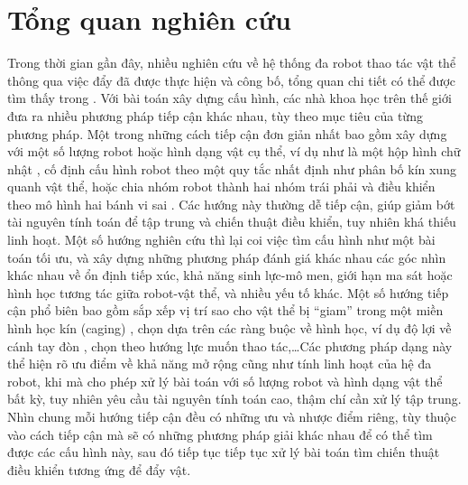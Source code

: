 \section{Tổng quan nghiên cứu}

Trong thời gian gần đây, nhiều nghiên cứu về hệ thống đa robot thao tác vật thể thông qua việc đẩy đã được thực hiện và công bố, tổng quan chi tiết có thể được tìm thấy trong \cite{tuci2018cooperative}. Với bài toán xây dựng cấu hình, các nhà khoa học trên thế giới đưa ra nhiều phương pháp tiếp cận khác nhau, tùy theo mục tiêu của từng phương pháp. Một trong những cách tiếp cận đơn giản nhất bao gồm xây dựng với một số lượng robot hoặc hình dạng vật cụ thể, ví dụ như là một hộp hình chữ nhật \cite{alkilabi2017cooperative}, cố định cấu hình robot theo một quy tắc nhất định như phân bố kín xung quanh vật thể, hoặc chia nhóm robot thành hai nhóm trái phải và điều khiển theo mô hình hai bánh vi sai \cite{nguyen2024distributed}. Các hướng này thường dễ tiếp cận, giúp giảm bớt tài nguyên tính toán để tập trung và chiến thuật điều khiển, tuy nhiên khá thiếu linh hoạt.  Một số hướng nghiên cứu thì lại coi việc tìm cấu hình như một bài toán tối ưu, và xây dựng những phương pháp đánh giá khác nhau các góc nhìn khác nhau về ổn định tiếp xúc, khả năng sinh lực-mô men, giới hạn ma sát hoặc hình học tương tác giữa robot-vật thể, và nhiều yếu tố khác. Một số hướng tiếp cận phổ biên bao gồm sắp xếp vị trí sao cho vật thể bị “giam” trong một miền hình học kín (caging) \cite{pereira2002decentralized}, chọn dựa trên các ràng buộc về hình học, ví dụ độ lợi về cánh tay đòn \cite{ebel2021nonprehensile}, chọn theo hướng lực muốn thao tác,\dots Các phương pháp dạng này thể hiện rõ ưu điểm về khả năng mở rộng cũng như tính linh hoạt của hệ đa robot, khi mà cho phép xử lý bài toán với số lượng robot và hình dạng vật thể bất kỳ, tuy nhiên yêu cầu tài nguyên tính toán cao, thậm chí cần xử lý tập trung. Nhìn chung mỗi hướng tiếp cận đều có những ưu và nhược điểm riêng, tùy thuộc vào cách tiếp cận mà sẽ có những phương pháp giải khác nhau để có thể tìm được các cấu hình này, sau đó tiếp tục tiếp tục xử lý bài toán tìm chiến thuật điều khiển tương ứng để đẩy vật.

